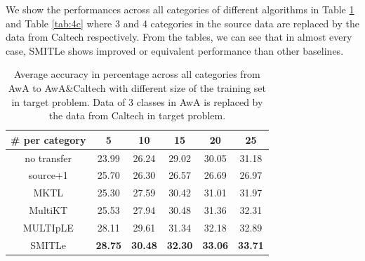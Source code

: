 We show the performances across all categories of different algorithms in Table \ref{tab:3c} and Table \ref{tab:4c} where 3 and 4 categories in the source data are replaced by the data from Caltech respectively. From the tables, we can see that in almost every case, SMITLe shows improved or equivalent performance than other baselines. %

\begin{table}[htbp]
  \centering
  \caption{Average accuracy in percentage across all categories from AwA to AwA\&Caltech with different size of the training set in target problem. Data of 3 classes in AwA is replaced by the data from Caltech in target problem.}
    \begin{tabular}{|c|c|c|c|c|c|}
    \hline
      \# per category    & 5     & 10    & 15    & 20    & 25 \\
    \hline
    no transfer &         23.99  &         26.24  &         29.02  &         30.05  &         31.18  \\
    source+1 &         25.70  &         26.30  &         26.57  &         26.69  &         26.97  \\
    MKTL  &         25.30  &         27.59  &         30.42  &         31.01  &         31.97  \\
    MultiKT &         25.53  &         27.94  &         30.48  &         31.36  &         32.31  \\
    MULTIpLE &         28.11  &         29.61  &         31.34  &         32.18  &         32.89  \\
    SMITLe &         \textbf{28.75}  &         \textbf{30.48}  &         \textbf{32.30}  &         \textbf{33.06}  &         \textbf{33.71}  \\
    \hline
    \end{tabular}%
  \label{tab:3c}%
\end{table}%



